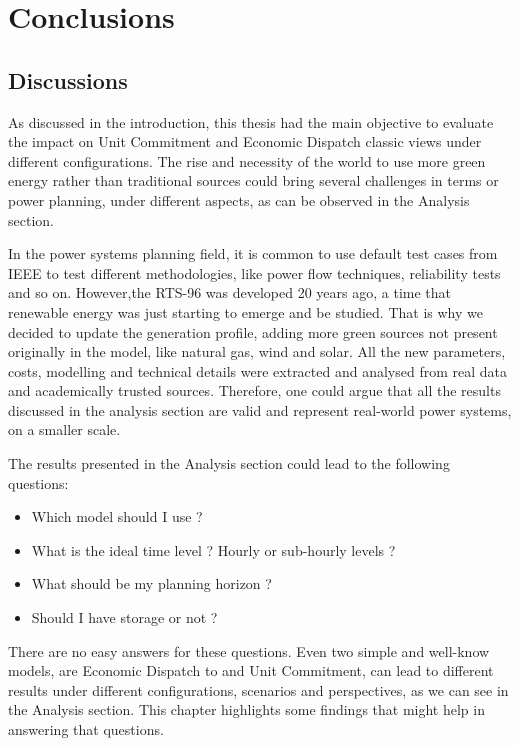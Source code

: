\documentclass[12pt,LUDisStyle,twosided]{book}
\begin{document}
\chapter{Conclusions}

\section{Discussions}

As discussed in the introduction, this thesis had the main objective to evaluate the impact on Unit Commitment and Economic Dispatch classic views under different configurations. The rise and necessity of the world to use more green energy rather than traditional sources could bring several challenges in terms or power planning, under different aspects, as can be observed in the Analysis section. 

In the power systems planning field, it is common to use default test cases from IEEE to test different methodologies, like power flow techniques, reliability tests and so on. However,the RTS-96 was developed 20 years ago, a time that renewable energy was just starting to emerge and be studied. That is why we decided to update the generation profile, adding more green sources not present originally in the model, like natural gas, wind and solar. All the new parameters, costs, modelling and technical details were extracted and analysed from real data and academically trusted sources. Therefore, one could argue that all the results discussed in the analysis section are valid and represent real-world power systems, on a smaller scale.

The results presented in the Analysis section could lead to the following questions:

\begin{itemize}
\item Which model should I use ?
\item What is the ideal time level ? Hourly or sub-hourly levels ?
\item What should be my planning horizon ?
\item Should I have storage or not ?
\end{itemize}

There are no easy answers for these questions. Even two simple and well-know models, are Economic Dispatch to and Unit Commitment, can lead to different results under different configurations, scenarios and perspectives, as we can see in the Analysis section. This chapter highlights some findings that might help in answering that questions.
\end{document}
